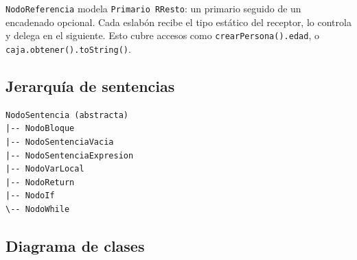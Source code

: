 \documentclass[11pt,a4paper]{article}
\begin{document}
\texttt{NodoReferencia} modela \texttt{Primario RResto}: un primario seguido de un
encadenado opcional. Cada eslabón recibe el tipo estático del receptor, lo controla
y delega en el siguiente. Esto cubre accesos como \texttt{crearPersona().edad}, o \texttt{caja.obtener().toString()}.

\subsection{Jerarquía de sentencias}

{\footnotesize
\begin{verbatim}
NodoSentencia (abstracta)
|-- NodoBloque
|-- NodoSentenciaVacia
|-- NodoSentenciaExpresion
|-- NodoVarLocal
|-- NodoReturn
|-- NodoIf
\-- NodoWhile
\end{verbatim}
}

\subsection{Diagrama de clases}
\end{document}

